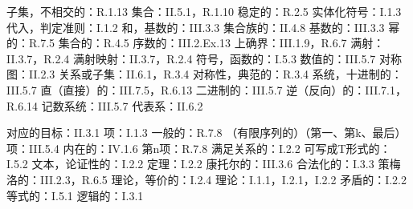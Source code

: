 \begin{Shaded}
\begin{Highlighting}[]
\end{Highlighting}
\end{Shaded}

子集，不相交的：R.1.13 集合：II.5.1，R.1.10 稳定的：R.2.5 实体化符号：I.1.3 代入，判定准则：I.1.2 和，基数的：III.3.3 集合族的：II.4.8 基数的：III.3.3 幂的：R.7.5 集合的：R.4.5 序数的：III.2.Ex.13 上确界：III.1.9，R.6.7 满射：II.3.7，R.2.4 满射映射：II.3.7，R.2.4 符号，函数的：I.5.3 数值的：III.5.7 对称图：II.2.3 关系或子集：II.6.1，R.3.4 对称性，典范的：R.3.4 系统，十进制的：III.5.7 直（直接）的：III.7.5，R.6.13 二进制的：III.5.7 逆（反向）的：III.7.1，R.6.14 记数系统：III.5.7 代表系：II.6.2

对应的目标：II.3.1 项：I.1.3 一般的：R.7.8 （有限序列的）（第一、第k、最后）项：III.5.4 内在的：IV.1.6 第n项：R.7.8 满足关系的：I.2.2 可写成T形式的：I.5.2 文本，论证性的：I.2.2 定理：I.2.2 康托尔的：III.3.6 合法化的：I.3.3 策梅洛的：III.2.3，R.6.5 理论，等价的：I.2.4 理论：I.1.1，I.2.1，I.2.2 矛盾的：I.2.2 等式的：I.5.1 逻辑的：I.3.1

